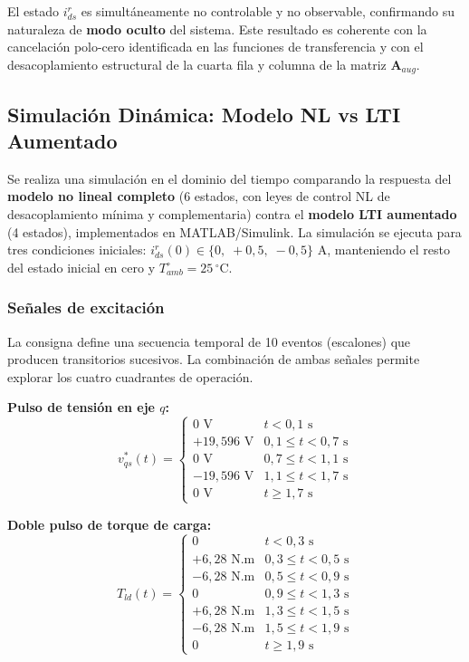 \documentclass[12pt, a4paper,journal, onecolumn, compsoc]{IEEEtran}
\begin{document}
El estado $i_{ds}^r$ es simultáneamente no controlable y no observable, confirmando su naturaleza de \textbf{modo oculto} del sistema. Este resultado es coherente con la cancelación polo-cero identificada en las funciones de transferencia y con el desacoplamiento estructural de la cuarta fila y columna de la matriz $\mathbf{A}_{aug}$.

\subsection{Simulación Dinámica: Modelo NL vs LTI Aumentado}
\label{sec:sim_dinamica}

Se realiza una simulación en el dominio del tiempo comparando la respuesta del \textbf{modelo no lineal completo} (6 estados, con leyes de control NL de desacoplamiento mínima y complementaria) contra el \textbf{modelo LTI aumentado} (4 estados), implementados en MATLAB/Simulink. La simulación se ejecuta para tres condiciones iniciales: $i_{ds}^r(0) \in \{0,\; +0{,}5,\; -0{,}5\}$ A, manteniendo el resto del estado inicial en cero y $T_{amb}^\circ = 25\,^\circ$C.

\subsubsection{Señales de excitación}

La consigna define una secuencia temporal de 10 eventos (escalones) que producen transitorios sucesivos. La combinación de ambas señales permite explorar los cuatro cuadrantes de operación.

\textbf{Pulso de tensión en eje $q$:}
\begin{equation}
v_{qs}^*(t) = \begin{cases}
0 \text{ V} & t < 0{,}1 \text{ s} \\
+19{,}596 \text{ V} & 0{,}1 \leq t < 0{,}7 \text{ s} \\
0 \text{ V} & 0{,}7 \leq t < 1{,}1 \text{ s} \\
-19{,}596 \text{ V} & 1{,}1 \leq t < 1{,}7 \text{ s} \\
0 \text{ V} & t \geq 1{,}7 \text{ s}
\end{cases}
\end{equation}

\textbf{Doble pulso de torque de carga:}
\begin{equation}
T_{ld}(t) = \begin{cases}
0 & t < 0{,}3 \text{ s} \\
+6{,}28 \text{ N.m} & 0{,}3 \leq t < 0{,}5 \text{ s} \\
-6{,}28 \text{ N.m} & 0{,}5 \leq t < 0{,}9 \text{ s} \\
0 & 0{,}9 \leq t < 1{,}3 \text{ s} \\
+6{,}28 \text{ N.m} & 1{,}3 \leq t < 1{,}5 \text{ s} \\
-6{,}28 \text{ N.m} & 1{,}5 \leq t < 1{,}9 \text{ s} \\
0 & t \geq 1{,}9 \text{ s}
\end{cases}
\end{equation}
\end{document}
